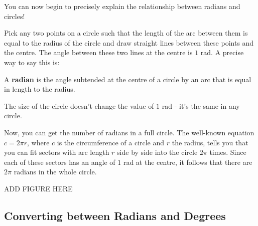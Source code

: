 \documentclass[
  12pt,
  a4paper, oneside]{starmastarticle}
\begin{document}
You can now begin to precisely explain the relationship between radians
and circles!

Pick any two points on a circle such that the length of the arc between
them is equal to the radius of the circle and draw straight lines
between these points and the centre. The angle between these two lines
at the centre is \(1\) rad. A precise way to say this is:

\begin{tcolorbox}[enhanced jigsaw, breakable, toptitle=1mm, toprule=.15mm, titlerule=0mm, colframe=quarto-callout-note-color-frame, colback=white, colbacktitle=quarto-callout-note-color!10!white, coltitle=black, opacityback=0, leftrule=.75mm, bottomrule=.15mm, opacitybacktitle=0.6, arc=.35mm, bottomtitle=1mm, title=\textcolor{quarto-callout-note-color}{\faInfo}\hspace{0.5em}{Definition of a radian}, rightrule=.15mm, left=2mm]
A \textbf{radian} is the angle subtended at the centre of a circle by an
arc that is equal in length to the radius.
\end{tcolorbox}

\begin{tcolorbox}[enhanced jigsaw, breakable, toptitle=1mm, toprule=.15mm, titlerule=0mm, colframe=quarto-callout-tip-color-frame, colback=white, colbacktitle=quarto-callout-tip-color!10!white, coltitle=black, opacityback=0, leftrule=.75mm, bottomrule=.15mm, opacitybacktitle=0.6, arc=.35mm, bottomtitle=1mm, title=\textcolor{quarto-callout-tip-color}{\faLightbulb}\hspace{0.5em}{Tip}, rightrule=.15mm, left=2mm]
The size of the circle doesn't change the value of \(1\) rad - it's the
same in any circle.
\end{tcolorbox}

Now, you can get the number of radians in a full circle. The well-known
equation \(c = 2 \pi r\), where \(c\) is the circumference of a circle
and \(r\) the radius, tells you that you can fit sectors with arc length
\(r\) side by side into the circle \(2\pi\) times. Since each of these
sectors has an angle of \(1\) rad at the centre, it follows that there
are \(2\pi\) radians in the whole circle.

ADD FIGURE HERE

\hypertarget{converting-between-radians-and-degrees}{%
\subsection{Converting between Radians and
Degrees}\label{converting-between-radians-and-degrees}}
\end{document}
